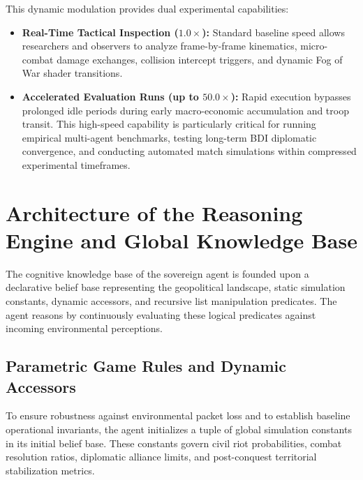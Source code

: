 This dynamic modulation provides dual experimental capabilities:
\begin{itemize}
    \item \textbf{Real-Time Tactical Inspection ($1.0\times$):} Standard baseline speed allows researchers and observers to analyze frame-by-frame kinematics, micro-combat damage exchanges, collision intercept triggers, and dynamic Fog of War shader transitions.
    \item \textbf{Accelerated Evaluation Runs (up to $50.0\times$):} Rapid execution bypasses prolonged idle periods during early macro-economic accumulation and troop transit. This high-speed capability is particularly critical for running empirical multi-agent benchmarks, testing long-term BDI diplomatic convergence, and conducting automated match simulations within compressed experimental timeframes.
\end{itemize}





\section{Architecture of the Reasoning Engine and Global Knowledge Base}
\label{sec:impl_knowledge_base}

The cognitive knowledge base of the sovereign agent is founded upon a declarative belief base representing the geopolitical landscape, static simulation constants, dynamic accessors, and recursive list manipulation predicates. The agent reasons by continuously evaluating these logical predicates against incoming environmental perceptions.

\subsection{Parametric Game Rules and Dynamic Accessors}
\label{sec:impl_game_rules}

To ensure robustness against environmental packet loss and to establish baseline operational invariants, the agent initializes a tuple of global simulation constants in its initial belief base. These constants govern civil riot probabilities, combat resolution ratios, diplomatic alliance limits, and post-conquest territorial stabilization metrics.

